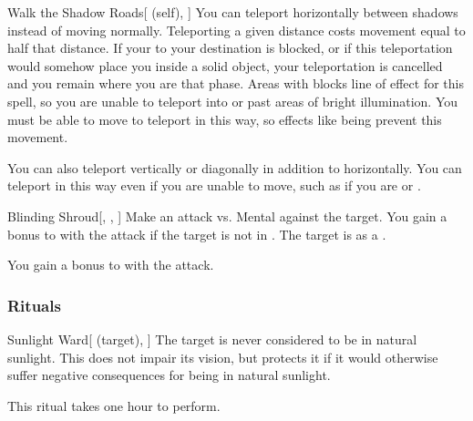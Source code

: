 \lowercase{\hypertarget{spell:Walk the Shadow Roads}{}}\label{spell:Walk the Shadow Roads}
\begin{attuneability}[Rank 4]{\hypertarget{spell:Walk the Shadow Roads}{Walk the Shadow Roads}}[ (self), ]
You can teleport horizontally between shadows instead of moving normally.
Teleporting a given distance costs movement equal to half that distance.
If your  to your destination is blocked, or if this teleportation would somehow place you inside a solid object, your teleportation is cancelled and you remain where you are that phase.
Areas with  blocks line of effect for this spell, so you are unable to teleport into or past areas of bright illumination.
You must be able to move to teleport in this way, so effects like being  prevent this movement.

\rankline
{} You can also teleport vertically or diagonally in addition to horizontally.
 You can teleport in this way even if you are unable to move, such as if you are  or .
\end{attuneability}
\vspace{0.25em}



\lowercase{\hypertarget{spell:Blinding Shroud}{}}\label{spell:Blinding Shroud}
\begin{freeability}[Rank 6]{\hypertarget{spell:Blinding Shroud}{Blinding Shroud}}[, , ]
Make an attack vs. Mental against the target.
You gain a  bonus to  with the attack if the target is not in .
\hit The target is  as a .

\rankline
{} You gain a  bonus to  with the attack.
\end{freeability}
\vspace{0.25em}



\subsubsection{Rituals}


\lowercase{\hypertarget{spell:Sunlight Ward}{}}\label{spell:Sunlight Ward}
\begin{attuneability}[Rank 3]{\hypertarget{spell:Sunlight Ward}{Sunlight Ward}}[ (target), ]
The target is never considered to be in natural sunlight.
This does not impair its vision, but protects it if it would otherwise suffer negative consequences for being in natural sunlight.

This ritual takes one hour to perform.
\end{attuneability}
\vspace{0.25em}


